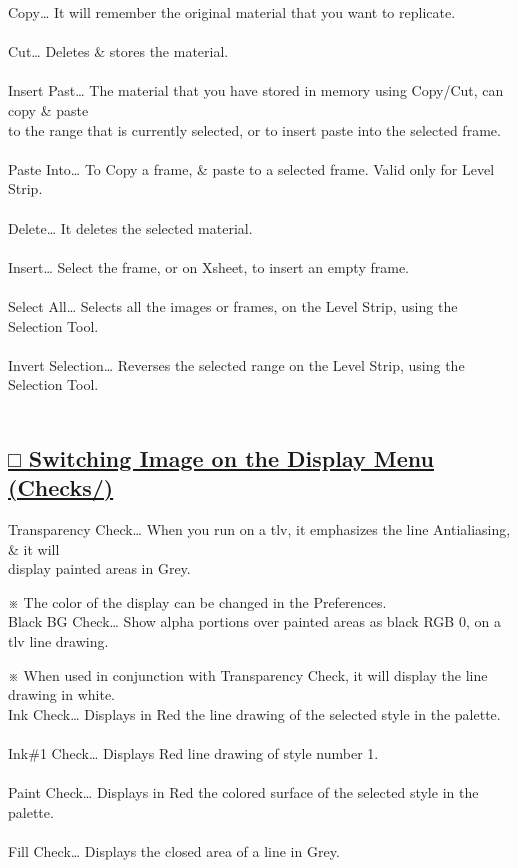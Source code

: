 \documentclass[a4paper,10pt]{article}
\begin{document}
\noindent Copy… It will remember the original material that you want to replicate.\\[-0.1em]
\\
Cut… Deletes \& stores the material.\\[-0.1em]
\\
Insert Past… The material that you have stored in memory using Copy/Cut, can copy \& paste\\[-0.1em]
to the range that is currently selected, or to insert paste into the selected frame.\\
\\
Paste Into… To Copy a frame, \& paste to a selected frame. Valid only for Level Strip.\\[-0.1em]
\\
Delete… It deletes the selected material.\\[-0.1em]
\\
Insert… Select the frame, or on Xsheet, to insert an empty frame.\\[-0.1em]
\\
Select All… Selects all the images or frames, on the Level Strip, using the Selection Tool. \\[-0.1em]
\\
Invert Selection… Reverses the selected range on the Level Strip, using the Selection Tool.\\[-0.1em]
\\

\subsection*{\uline{□ Switching Image on the Display Menu (Checks/)}}

\noindent Transparency Check… When you run on a tlv, it emphasizes the line Antialiasing, \& it will\\
display painted areas in Grey.\par
\footnotesize
\noindent ※ The color of the display can be changed in the Preferences.\\[1em]
\normalsize Black BG Check… Show alpha portions over painted areas as black RGB 0, on a tlv line drawing.\par
\footnotesize
\noindent ※ When used in conjunction with Transparency Check, it will display the line drawing in white.\\[1em]
\normalsize Ink Check… Displays in Red the line drawing of the selected style in the palette.\\[-0.1em]
\\
Ink\#1 Check… Displays Red line drawing of style number 1.\\[-0.1em]
\\
Paint Check… Displays in Red the colored surface of the selected style in the palette.\\[-0.1em]
\\
Fill Check… Displays the closed area of a line in Grey.
\end{document}
